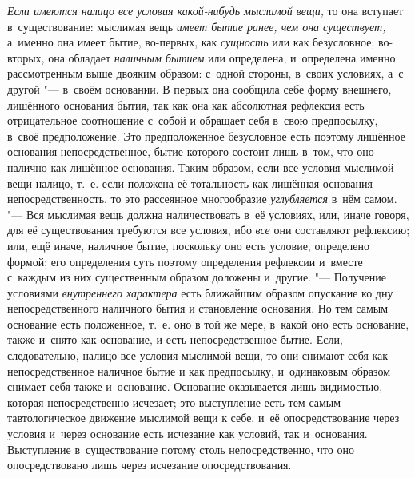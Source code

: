 {\em Если имеются налицо все условия какой-нибудь
мыслимой вещи,} то она вступает в~существование: мыслимая вещь
{\em имеет бытие ранее, чем она существует,} а~именно
она имеет бытие, во-первых, как {\em сущность} или как
безусловное; во-вторых, она обладает {\em наличным
бытием} или определена, и~определена именно рассмотренным выше двояким
образом: с~одной стороны, в~своих условиях, а~с другой "--- в~своём основании.
В первых она сообщила себе форму внешнего, лишённого основания бытия, так
как она как абсолютная рефлексия есть отрицательное соотношение с~собой и
обращает себя в~свою предпосылку, в~своё предположение. Это предположенное
безусловное есть поэтому лишённое основания непосредственное, бытие
которого состоит лишь в~том, что оно налично как лишённое основания. Таким
образом, если все условия мыслимой вещи налицо, т.~е. если положена её
тотальность как лишённая основания непосредственность, то это рассеянное
многообразие {\em углубляется} в~нём самом. "--- Вся
мыслимая вещь должна наличествовать в~её условиях, или, иначе говоря, для
её существования требуются все условия, ибо {\em все}
они составляют рефлексию; или, ещё иначе, наличное бытие, поскольку оно
есть условие, определено формой; его определения суть поэтому определения
рефлексии и~вместе с~каждым из них существенным образом доложены и~другие.
"--- Получение условиями {\em внутреннего характера} есть
ближайшим образом опускание ко дну непосредственного наличного бытия и
становление основания. Но тем самым основание есть положенное, т.~е. оно в
той же мере, в~какой оно есть основание, также и~снято как основание, и
есть непосредственное бытие. Если, следовательно, налицо все условия
мыслимой вещи, то они снимают себя как непосредственное наличное бытие и
как предпосылку, и~одинаковым образом снимает себя также и~основание.
Основание оказывается лишь видимостью, которая непосредственно исчезает;
это выступление есть тем самым тавтологическое движение мыслимой вещи к
себе, и~её опосредствование через условия и~через основание есть исчезание
как условий, так и~основания. Выступление в~существование потому столь
непосредственно, что оно опосредствовано лишь через исчезание
опосредствования.

